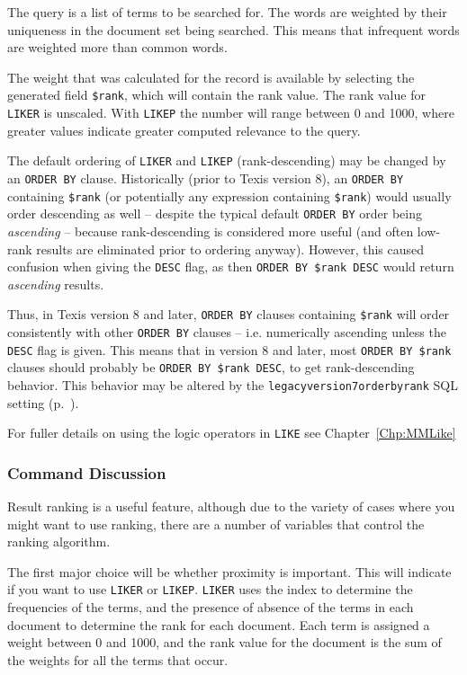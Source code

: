The query is a list of terms to be searched for.  The words are weighted
by their uniqueness in the document set being searched.  This means that
infrequent words are weighted more than common words.

The weight that was calculated for the record is available by
 selecting the generated field \verb`$rank`, which will contain the rank
 value.  The rank value for \verb`LIKER` is unscaled.  With
 \verb`LIKEP` the number will range between 0 and 1000, where greater
 values indicate greater computed relevance to the query.

The default ordering of \verb`LIKER` and \verb`LIKEP`
 (rank-descending) may be changed by an \verb`ORDER BY` clause.
  Historically (prior to Texis version 8), an \verb`ORDER BY`
 containing \verb`$rank` (or potentially any expression containing
 \verb`$rank`) would usually order descending as well -- despite the
 typical default \verb`ORDER BY` order being {\em ascending} --
 because rank-descending is considered more useful (and often low-rank
 results are eliminated prior to ordering anyway).  However, this
 caused confusion when giving the \verb`DESC` flag, as then {\tt ORDER
 BY \$rank DESC} would return {\em ascending} results.

Thus, in Texis version 8 and later, \verb`ORDER BY` clauses containing
 \verb`$rank` will order consistently with other \verb`ORDER BY`
 clauses -- i.e. numerically ascending unless the \verb`DESC` flag is
 given.  This means that in version 8 and later, most {\tt ORDER BY
 \$rank} clauses should probably be {\tt ORDER BY \$rank DESC}, to get
 rank-descending behavior.  This behavior may be altered by the
 \verb`legacyversion7orderbyrank` SQL setting
 (p.~\pageref{SqlPropertyLegacyVersion7OrderByRank}).

For fuller details on using the logic operators in \verb`LIKE` see
Chapter~\ref{Chp:MMLike}
\subsubsection{Command Discussion}

Result ranking is a useful feature, although due to the variety of cases
where you might want to use ranking, there are a number of variables that
control the ranking algorithm.

The first major choice will be whether proximity is important.  This
will indicate if you want to use \verb`LIKER` or \verb`LIKEP`.  \verb`LIKER` uses the index
to determine the frequencies of the terms, and the presence of absence
of the terms in each document to determine the rank for each document.
Each term is assigned a weight between 0 and 1000, and the rank value
for the document is the sum of the weights for all the terms that
occur.

